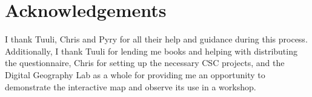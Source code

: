 \section*{Acknowledgements}

I thank Tuuli, Chris and Pyry for all their help and guidance during this process.
Additionally,
I thank Tuuli for lending me books and
helping with distributing the questionnaire,
Chris for setting up the necessary CSC projects,
and the Digital Geography Lab as a whole
for providing me an opportunity to demonstrate the interactive map
and observe its use in a workshop.
